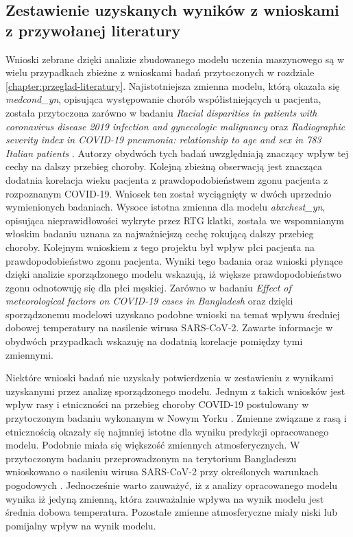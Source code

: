 \documentclass[polish, twoside, 12pt, a4paper]{article}
\theoremstyle{definition}
\theoremstyle{plain}
\theoremstyle{remark}
\begin{document}
\subsection{Zestawienie uzyskanych wyników z wnioskami z przywołanej literatury}

Wnioski zebrane dzięki analizie zbudowanego modelu uczenia maszynowego są w wielu przypadkach zbieżne z wnioskami badań przytoczonych w rozdziale \ref{chapter:przeglad-literatury}. Najistotniejsza zmienna modelu, którą okazała się \emph{medcond\_yn}, opisująca występowanie chorób współistniejących u pacjenta, została przytoczona zarówno w badaniu \emph{Racial disparities in patients with coronavirus disease 2019 infection and gynecologic malignancy} \citep{wang2020} oraz \emph{Radiographic severity index in COVID-19 pneumonia: relationship to age and sex in 783 Italian patients} \citep{borghesi2020}. Autorzy obydwóch tych badań uwzględniają znaczący wpływ tej cechy na dalszy przebieg choroby. Kolejną zbieżną obserwacją jest znacząca dodatnia korelacja wieku pacjenta z prawdopodobieństwem zgonu pacjenta z rozpoznanym COVID-19. Wniosek ten został wyciągnięty w dwóch uprzednio wymienionych badaniach. Wysoce istotna zmienna dla modelu \emph{abxchest\_yn}, opisująca nieprawidłowości wykryte przez RTG klatki, została we wspomnianym  włoskim badaniu uznana za najważniejszą cechę rokującą dalszy przebieg choroby. Kolejnym wnioskiem z tego projektu był wpływ płci pacjenta na prawdopodobieństwo zgonu pacjenta. Wyniki tego badania oraz wnioski płynące dzięki analizie sporządzonego modelu wskazują, iż większe prawdopodobieństwo zgonu odnotowuję się dla płci męskiej. Zarówno w badaniu \emph{Effect of meteorological factors on COVID-19 cases in Bangladesh} \citep{hasanuzzaman2020} oraz dzięki sporządzonemu modelowi uzyskano podobne wnioski na temat wpływu średniej dobowej temperatury na nasilenie wirusa SARS‑CoV‑2. Zawarte informacje w obydwóch przypadkach wskazuję na dodatnią korelacje pomiędzy tymi zmiennymi.

Niektóre wnioski badań nie uzyskały potwierdzenia w zestawieniu z wynikami uzyskanymi przez analizę sporządzonego modelu. Jednym z takich wniosków jest wpływ rasy i etniczności na przebieg choroby COVID-19 postulowany w przytoczonym badaniu wykonanym w Nowym Yorku \citep{wang2020}. Zmienne związane z rasą i etnicznością okazały się najmniej istotne dla wyniku predykcji opracowanego modelu. Podobnie miała się większość zmiennych atmosferycznych. W przytoczonym badaniu przeprowadzonym na terytorium Bangladeszu wnioskowano o nasileniu wirusa SARS-CoV-2 przy określonych warunkach pogodowych \citep{hasanuzzaman2020}. Jednocześnie warto zauważyć, iż z analizy opracowanego modelu wynika iż jedyną zmienną, która zauważalnie wpływa na wynik modelu jest średnia dobowa temperatura. Pozostałe zmienne atmosferyczne miały niski lub pomijalny wpływ na wynik modelu.
\end{document}
